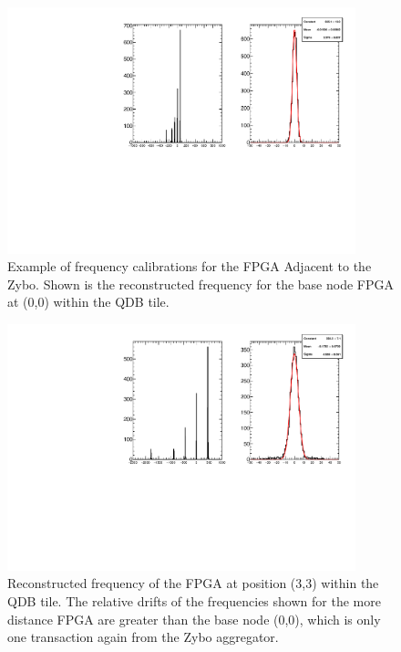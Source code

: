 \begin{figure}[]
\centering
\includegraphics[width=0.9\textwidth]{images/(0,0).pdf}
\caption{Example of frequency calibrations for the FPGA Adjacent to the Zybo.
Shown is the reconstructed frequency for the base node FPGA at (0,0) within the QDB tile.
}
\end{figure}

\begin{figure}[]
\centering
\includegraphics[width=0.9\textwidth]{images/(3,3).pdf}
\caption{Reconstructed frequency of the FPGA at position (3,3) within the QDB tile.
The relative drifts of the frequencies shown for the more distance FPGA are greater than the base node (0,0), which is only one transaction again from the Zybo aggregator.
}
\end{figure}

